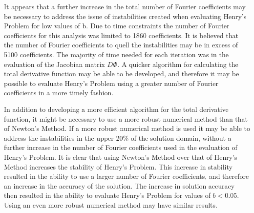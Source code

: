 \documentclass{article}
\begin{document}
It appears that a further increase in the total number of Fourier coefficients
may be necessary to address the issue of instabilities created when evaluating
Henry's Problem for low values of b. Due to time constraints the number of
Fourier coefficients for this analysis was limited to 1860 coefficients. It is
believed that the number of Fourier coefficients to quell the instabilities may
be in excess of 5100 coefficients. The majority of time needed for each
iteration was in the evaluation of the Jacobian matrix $D\Phi $. A quicker
algorithm for calculating the total derivative function may be able to be
developed, and therefore it may be possible to evaluate Henry's Problem using a
greater number of Fourier coefficients in a more timely fashion.

In addition to developing a more efficient algorithm for the total derivative
function, it might be necessary to use a more robust numerical method than that
of Newton's Method. If a more robust numerical method is used it may be able to
address the instabilities in the upper 20\% of the solution domain, without a
further increase in the number of Fourier coefficients used in the evaluation of
Henry's Problem. It is clear that using Newton's Method over that of Henry's
Method increases the stability of Henry's Problem. This increase in stability
resulted in the ability to use a larger number of Fourier coefficients, and
therefore an increase in the accuracy of the solution. The increase in solution
accuracy then resulted in the ability to evaluate Henry's Problem for values of
$b<0.05$. Using an even more robust numerical method may have similar results.
\end{document}
